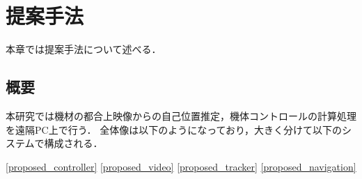 \chapter{提案手法}
\label{proposed}

本章では提案手法について述べる．

\section{概要}
本研究では機材の都合上映像からの自己位置推定，機体コントロールの計算処理を遠隔PC上で行う．
全体像は以下のようになっており，大きく分けて以下のシステムで構成される．

\ref{proposed_controller}
\ref{proposed_video}
\ref{proposed_tracker}
\ref{proposed_navigation}






